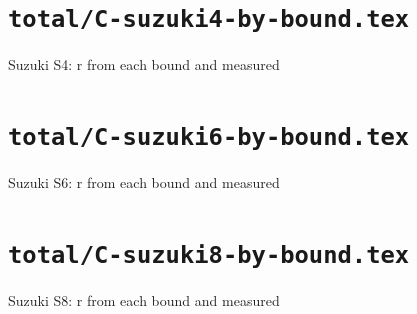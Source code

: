 \documentclass{article}
\begin{document}
\section*{\texttt{total/C-suzuki4-by-bound.tex}}
Suzuki S4: r from each bound and measured\par\medskip

\clearpage

\section*{\texttt{total/C-suzuki6-by-bound.tex}}
Suzuki S6: r from each bound and measured\par\medskip

\clearpage

\section*{\texttt{total/C-suzuki8-by-bound.tex}}
Suzuki S8: r from each bound and measured\par\medskip

\clearpage
\end{document}
